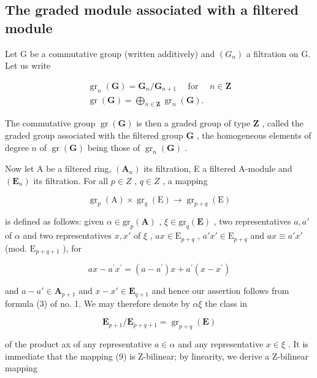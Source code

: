 \subsection{The graded module associated with a filtered module}

Let G be a commutative group (written additively) and \((G_{n})\) a filtration on G. Let us write

\[
\begin{array}{l} \operatorname{gr} _ {n} (\mathbf {G}) = \mathbf {G} _ {n} / \mathbf {G} _ {n + 1} \quad \text { for } \quad n \in \mathbf {Z} \\ \operatorname{gr} (\mathbf {G}) = \bigoplus_ {n \in \mathbf {Z}} \operatorname{gr} _ {n} (\mathbf {G}). \end{array}\tag{8}
\]

The commutative group \(\operatorname{gr}(\mathbf{G})\) is then a graded group of type \(\mathbf{Z}\) , called the graded group associated with the filtered group \(\mathbf{G}\) , the homogeneous elements of degree \(n\) of \(\operatorname{gr}(\mathbf{G})\) being those of \(\operatorname{gr}_n(\mathbf{G})\) .

Now let A be a filtered ring, \((\mathbf{A}_{n})\) its filtration, E a filtered A-module and \((\mathbf{E}_{n})\) its filtration. For all \(p \in Z\) , \(q \in Z\) , a mapping

\[
\operatorname{gr} _ {p} (\mathrm{A}) \times \operatorname{gr} _ {q} (\mathrm{E}) \rightarrow \operatorname{gr} _ {p + q} (\mathrm{E})\tag{9}
\]

is defined as follows: given \(\alpha \in \mathrm{gr}_p(\mathbf{A})\) , \(\xi \in \mathrm{gr}_q(\mathbf{E})\) , two representatives \(a, a'\) of \(\alpha\) and two representatives \(x, x'\) of \(\xi\) , \(ax \in \mathrm{E}_{p + q}\) , \(a'x' \in \mathrm{E}_{p + q}\) and \(ax \equiv a'x'\) (mod. \(\mathrm{E}_{p + q + 1}\) ), for

\[
a x - a ^ {\prime} x ^ {\prime} = (a - a ^ {\prime}) x + a ^ {\prime} (x - x ^ {\prime})
\]

and \(a - a' \in \mathbf{A}_{p+1}\) and \(x - x' \in \mathbf{E}_{q+1}\) and hence our assertion follows from formula (3) of no. 1. We may therefore denote by \(\alpha\xi\) the class in

\[
\mathbf {E} _ {p + 1} / \mathbf {E} _ {p + q + 1} = \operatorname{gr} _ {p + q} (\mathbf {E})
\]

of the product ax of any representative \(a \in \alpha\) and any representative \(x \in \xi\) . It is immediate that the mapping (9) is Z-bilinear; by linearity, we derive a Z-bilinear mapping

